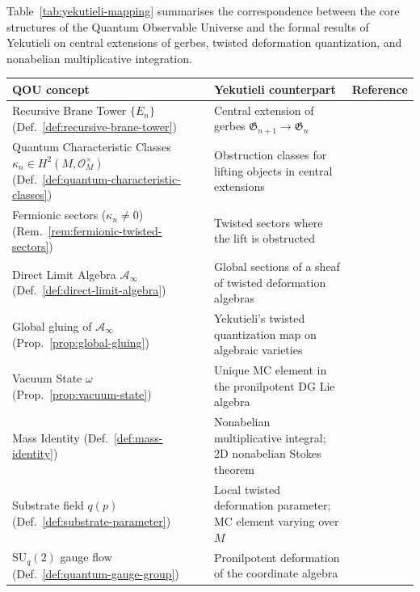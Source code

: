 
Table~\ref{tab:yekutieli-mapping} summarises the correspondence between the
core structures of the Quantum Observable Universe and the formal results
of Yekutieli on central extensions of gerbes, twisted deformation
quantization, and nonabelian multiplicative integration.

\begin{table}[ht]
\centering
\small
\begin{tabular}{p{4.2cm}p{4.8cm}p{4.5cm}}
\hline
\textbf{QOU concept} & \textbf{Yekutieli counterpart} & \textbf{Reference} \\
\hline
Recursive Brane Tower $\{E_n\}$
  (Def.~\ref{def:recursive-brane-tower})
  & Central extension of gerbes
    $\mathfrak{G}_{n+1} \to \mathfrak{G}_n$
  & \cite[Thm.~1.7]{yekutieli2010} \\[6pt]
Quantum Characteristic Classes $\kappa_n \in H^2(M, \mathcal{O}_M^{\times})$
  (Def.~\ref{def:quantum-characteristic-classes})
  & Obstruction classes for lifting objects in central extensions
  & \cite[\S3]{yekutieli2010} \\[6pt]
Fermionic sectors ($\kappa_n \neq 0$)
  (Rem.~\ref{rem:fermionic-twisted-sectors})
  & Twisted sectors where the lift is obstructed
  & \cite[Thm.~3.4]{yekutieli2010} \\[6pt]
Direct Limit Algebra $\mathcal{A}_\infty$
  (Def.~\ref{def:direct-limit-algebra})
  & Global sections of a sheaf of twisted deformation algebras
  & \cite{yekutieli2008} \\[6pt]
Global gluing of $\mathcal{A}_\infty$
  (Prop.~\ref{prop:global-gluing})
  & Yekutieli's twisted quantization map on algebraic varieties
  & \cite[Thm.~4.5]{yekutieli2010} \\[6pt]
Vacuum State $\omega$
  (Prop.~\ref{prop:vacuum-state})
  & Unique MC element in the pronilpotent DG Lie algebra
  & \cite{yekutieli2009} \\[6pt]
Mass Identity (Def.~\ref{def:mass-identity})
  & Nonabelian multiplicative integral; 2D nonabelian Stokes theorem
  & \cite[Ch.~5--6]{yekutieli2015} \\[6pt]
Substrate field $q(p)$
  (Def.~\ref{def:substrate-parameter})
  & Local twisted deformation parameter; MC element varying over $M$
  & \cite{yekutieli2008, yekutieli2009} \\[6pt]
$\mathrm{SU}_q(2)$ gauge flow
  (Def.~\ref{def:quantum-gauge-group})
  & Pronilpotent deformation of the coordinate algebra

\end{tabular}
\end{table}
